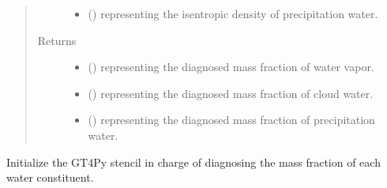 \documentclass[letterpaper,10pt,english]{sphinxmanual}
\begin{document}
\begin{fulllineitems}
\begin{fulllineitems}
\begin{quote}
\begin{description}
\begin{itemize}
\item {} 
 () \textendash{}  representing the isentropic density of precipitation water.

\end{itemize}

\item[{Returns}] \leavevmode
\begin{itemize}
\item {} 
 () \textendash{}  representing the diagnosed mass fraction of water vapor.

\item {} 
 () \textendash{}  representing the diagnosed mass fraction of cloud water.

\item {} 
 () \textendash{}  representing the diagnosed mass fraction of precipitation water.

\end{itemize}


\end{description}\end{quote}

\end{fulllineitems}


\begin{fulllineitems}
\label{\detokenize{api:tasmania.dycore.diagnostic_isentropic.DiagnosticIsentropic._stencil_diagnosing_mass_fraction_of_water_constituents_in_air_initialize}}
Initialize the GT4Py stencil in charge of diagnosing the mass fraction of each water constituent.

\end{fulllineitems}



\end{fulllineitems}
\end{document}
